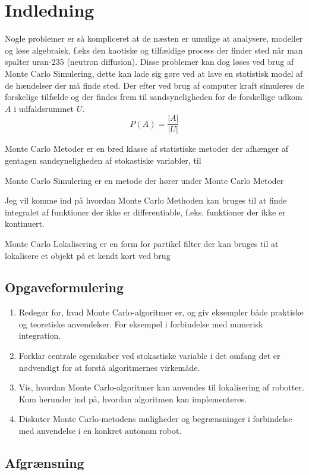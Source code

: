 \documentclass[../SRP.tex]{subfiles}
\begin{document}
\chapter{Indledning}
Nogle problemer er så kompliceret at de næsten er umulige at analysere, modeller og løse algebraisk, f.eks den kaotiske og tilfældige process der finder sted når man spalter uran-235 (neutron diffusion). Disse problemer kan dog løses ved brug af Monte Carlo Simulering, dette kan lade sig gøre ved at lave en statistisk model af de hændelser der må finde sted. Der efter ved brug af computer kraft simuleres de forskelige tilfælde og der findes frem til sandsyneligheden for de forskellige udkom $A$ i udfaldsrummet $U$.
\[
  P(A) = \frac{|A|}{|U|}
\]

Monte Carlo Metoder er en bred klasse af statistiske metoder der afhænger af gentagen sandsyneligheden af stokastiske variabler, til

Monte Carlo Simulering er en metode der hører under Monte Carlo Metoder

Jeg vil komme ind på hvordan Monte Carlo Methoden kan bruges til at finde integralet af funktioner der ikke er differentiable, f.eks. funktioner der ikke er kontinuert.

Monte Carlo Lokalisering er en form for partikel filter der kan bruges til at lokalisere et objekt på et kendt kort ved brug 


\section{Opgaveformulering}
  \begin{enumerate}[label=(\Roman*)]
  \item Redegør for, hvad Monte Carlo-algoritmer er, og giv eksempler både praktiske og teoretiske anvendelser. For eksempel i forbindelse med numerisk integration.\\

  \item Forklar centrale egenskaber ved stokastiske variable i det omfang det er nødvendigt for at forstå algoritmernes virkemåde.\\

  \item Vis, hvordan Monte Carlo-algoritmer kan anvendes til lokalisering af robotter. Kom herunder ind på, hvordan algoritmen kan implementeres.\\

  \item Diskuter Monte Carlo-metodens muligheder og begrænsninger i forbindelse med anvendelse i en konkret autonom robot.
  \end{enumerate}

\section{Afgrænsning}
\end{document}
